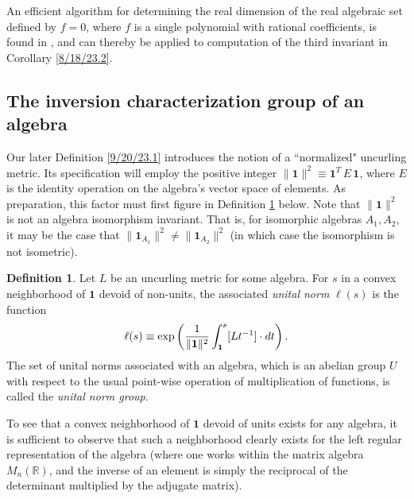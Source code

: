 \documentclass{amsart}
\numberwithin{equation}{section}
\theoremstyle{definition}
\newtheorem{definition}[theorem]{Definition}
\numberwithin{theorem}{section}
\begin{document}
An efficient algorithm for determining the real dimension of the real algebraic set defined by $f=0$, where $f$ is a single polynomial with rational coefficients, is found in \cite{bannwarth:2015}, and can thereby be applied to computation of the third invariant in Corollary \ref{8/18/23.2}. 

\subsection{The inversion characterization group of an algebra}
  
Our later Definition \ref{9/20/23.1} introduces the notion of a ``normalized" uncurling metric.  Its specification will employ the  positive integer $\|\mathbf{1}\|^2 \equiv \mathbf{1}^T \,E\, \mathbf{1}$, where $E$ is the identity operation on the algebra's vector space of elements. As preparation, this factor must first figure in Definition \ref{9/21/23.2} below.  Note that $\|\mathbf{1}\|^2$ is not an algebra isomorphism invariant.  That is, for isomorphic algebras $A_1,A_2$, it may be the case that $\|\mathbf{1}_{A_1}\|^2 \ne \|\mathbf{1}_{A_2}\|^2$ (in which case the isomorphism is not isometric).

  
  
  \begin{definition}\label{9/21/23.2} Let $L$ be an uncurling metric for some algebra.  For $s$ in a convex neighborhood of $\mathbf{1}$ devoid of non-units, the associated {\it unital norm} $ \ell(s)$ is the function
  \begin{equation}\label{11/7/20.2}   \ell(s) \equiv \exp\left({\frac{1}{\|{\bf 1}\|^2}\int_{\bf 1}^s [Lt^{-1}]\cdot dt}\right).\end{equation} 
   The set of unital norms associated with an algebra, which is an abelian group $U$ with respect to the usual point-wise operation of multiplication of functions, is called the {\it unital norm group}. \end{definition} 
   
To see that a convex neighborhood of $\mathbf{1}$ devoid of units exists for any algebra, it is sufficient to observe that such a neighborhood clearly exists for the left regular representation of the algebra (where one works within the matrix algebra $ M_n(\mathbb{R})$, and the inverse of an element is simply the reciprocal of the determinant multiplied by the adjugate matrix).
  
\end{document}
